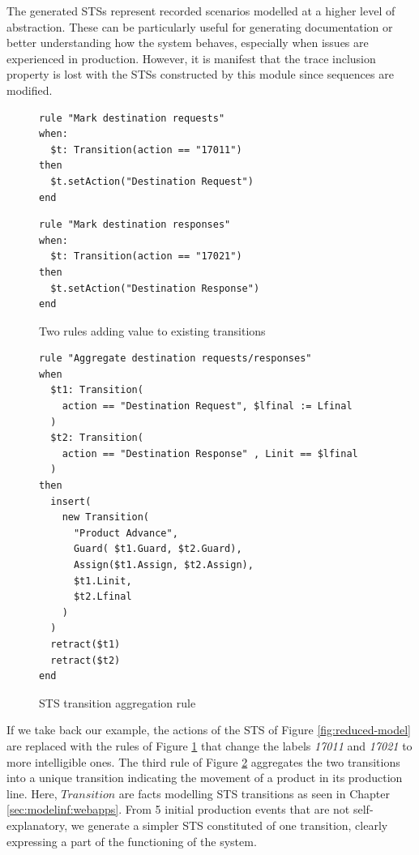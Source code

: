The generated STSs represent recorded scenarios modelled at a
higher level of abstraction. These can be particularly useful for
generating documentation or better understanding how the system
behaves, especially when issues are experienced in production.
However, it is manifest that the trace inclusion property is lost
with the STSs constructed by this module since sequences are
modified.

\begin{figure}[ht]
\begin{framed}
\begin{BVerbatim}
rule "Mark destination requests"
when:
  $t: Transition(action == "17011")
then
  $t.setAction("Destination Request")
end
\end{BVerbatim}
\end{framed}

\begin{framed}
\begin{BVerbatim}
rule "Mark destination responses"
when:
  $t: Transition(action == "17021")
then
  $t.setAction("Destination Response")
end
\end{BVerbatim}
\end{framed}

  \caption{Two rules adding value to existing transitions}
  \label{rule:rename-tr}
\end{figure}

\begin{figure}[ht]
\begin{framed}
\begin{BVerbatim}
rule "Aggregate destination requests/responses"
when
  $t1: Transition(
    action == "Destination Request", $lfinal := Lfinal
  )
  $t2: Transition(
    action == "Destination Response" , Linit == $lfinal
  )
then
  insert(
    new Transition(
      "Product Advance",
      Guard( $t1.Guard, $t2.Guard),
      Assign($t1.Assign, $t2.Assign),
      $t1.Linit,
      $t2.Lfinal
    )
  )
  retract($t1)
  retract($t2)
end
\end{BVerbatim}
\end{framed}

  \caption{STS transition aggregation rule}
  \label{rule:aggregate-tr}
\end{figure}

If we take back our example, the actions of the STS of Figure
\ref{fig:reduced-model} are replaced with the rules of Figure
\ref{rule:rename-tr} that change the labels \textit{17011} and
\textit{17021} to more intelligible ones. The third rule of
Figure \ref{rule:aggregate-tr} aggregates the two transitions
into a unique transition indicating the movement of a product in
its production line. Here, $Transition$ are facts modelling STS
transitions as seen in Chapter \ref{sec:modelinf:webapps}. From 5
initial production events that are not self-explanatory, we
generate a simpler STS constituted of one transition, clearly
expressing a part of the functioning of the system.

